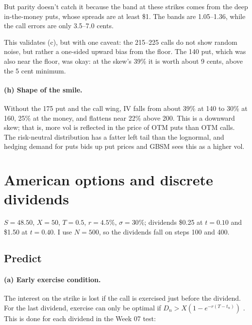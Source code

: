 \documentclass[11pt]{article}
\newcommand{\tbl}[1]{}
\begin{document}
But parity doesn't catch it because the band at these strikes comes from the deep in-the-money puts, whose spreads are at least \$1. The bands are 1.05--1.36, while the call errors are only 3.5--7.0 cents.

This validates (c), but with one caveat: the 215--225 calls do not show random noise, but rather a one-sided upward bias from the floor. The 140 put, which was also near the floor, was okay: at the skew's 39\% it is worth about 9 cents, above the 5 cent minimum.

\paragraph{(h) Shape of the smile.} Without the 175 put and the call wing, IV falls from about 39\% at 140 to 30\% at 160, 25\% at the money, and flattens near 22\% above 200. This is a downward skew; that is, more vol is reflected in the price of OTM puts than OTM calls. The risk-neutral distribution has a fatter left tail than the lognormal, and hedging demand for puts bids up put prices and GBSM sees this as a higher vol.

\section{American options and discrete dividends}

$S=48.50$, $X=50$, $T=0.5$, $r=4.5\%$, $\sigma=30\%$; dividends \$0.25 at $t=0.10$ and \$1.50 at $t=0.40$. I use $N=500$, so the dividends fall on steps 100 and 400.

\subsection*{Predict}

\paragraph{(a) Early exercise condition.} The interest on the strike is lost if the call is exercised just before the dividend. For the last dividend, exercise can only be optimal if $D_n>X(1-e^{-r(T-t_n)})$ \citep[Ch.~15]{hull2021options}. This is done for each dividend in the Week 07 test:

\begin{table}[H]
\centering\small
\caption{The Week 07 condition for each dividend.}
\tbl{p2_condition}
\end{table}
\end{document}
